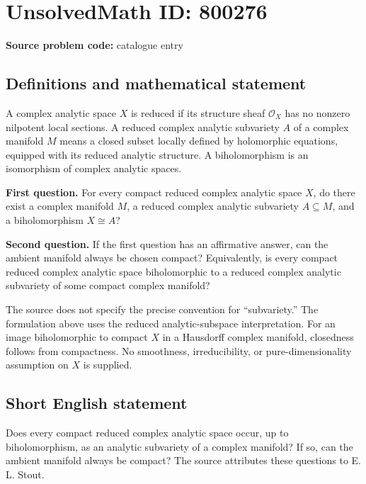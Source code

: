 \documentclass[11pt]{article}
\begin{document}
\section*{UnsolvedMath ID: 800276}
\textbf{Source problem code:} catalogue entry
\subsection{Definitions and mathematical statement}
A complex analytic space \(X\) is reduced if its structure sheaf \(\mathcal O_X\) has no nonzero nilpotent local sections. A reduced complex analytic subvariety \(A\) of a complex manifold \(M\) means a closed subset locally defined by holomorphic equations, equipped with its reduced analytic structure. A biholomorphism is an isomorphism of complex analytic spaces.

\textbf{First question.} For every compact reduced complex analytic space \(X\), do there exist a complex manifold \(M\), a reduced complex analytic subvariety \(A\subseteq M\), and a biholomorphism \(X\cong A\)?

\textbf{Second question.} If the first question has an affirmative answer, can the ambient manifold always be chosen compact? Equivalently, is every compact reduced complex analytic space biholomorphic to a reduced complex analytic subvariety of some compact complex manifold?

The source does not specify the precise convention for ``subvariety.'' The formulation above uses the reduced analytic-subspace interpretation. For an image biholomorphic to compact \(X\) in a Hausdorff complex manifold, closedness follows from compactness. No smoothness, irreducibility, or pure-dimensionality assumption on \(X\) is supplied.
\subsection{Short English statement}
Does every compact reduced complex analytic space occur, up to biholomorphism, as an analytic subvariety of a complex manifold? If so, can the ambient manifold always be compact? The source attributes these questions to E. L. Stout.
\end{document}
